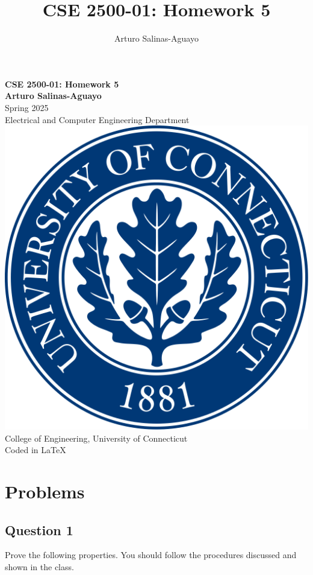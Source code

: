 \documentclass[12pt]{article}
\author{Arturo Salinas-Aguayo}
\title{CSE 2500-01: Homework 5}
\begin{document}
\newcommand{\closure}[2][3]{\mkern#1mu\overline{\mkern-#1mu#2}}
\newcommand{\ncoverline}[1]{\mkern1mu\overline{\mkern-1mu#1\mkern-1mu}\mkern1mu}

\begin{titlepage}
	\centering
	\vspace*{3cm}
	\huge\textbf{CSE 2500-01: Homework 5}\\
	\vspace{5cm}
	\Large\textbf{Arturo Salinas-Aguayo}\\
	\normalsize
	Spring 2025\\
	Electrical and Computer Engineering Department\\
	\vfill
	\includegraphics[scale=0.1]{uconnlogo}\\
	College of Engineering, University of Connecticut\\
	\scriptsize{Coded in \LaTeX}
	\vspace*{1cm}
\end{titlepage}

\section*{Problems}
\subsection*{Question 1}
Prove the following properties. You should follow the procedures discussed and shown in the class.
\end{document}

